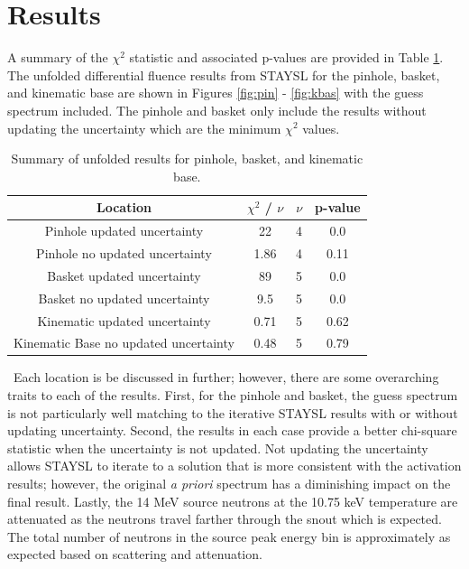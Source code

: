 \documentclass[journal]{IEEEtran}
\let\MYoriglatexcaption\caption
\renewcommand{\caption}[2][\relax]{\MYoriglatexcaption[#2]{#2}}
\begin{document}

\section{Results}

A summary of the $\chi^{2}$ statistic and associated p-values are provided in Table \ref{Table:STAY}. The unfolded differential fluence results from STAYSL for the pinhole, basket, and kinematic base are shown in Figures \ref{fig:pin} - \ref{fig:kbas} with the guess spectrum included. The pinhole and basket only include the results without updating the uncertainty which are the minimum $\chi^{2}$ values. 

\begin{table}[h]
	\caption{Summary of unfolded results for pinhole, basket, and kinematic base.}
	\label{Table:STAY}	
	\centering
	\begin{tabular}{|c|c|c|c|}
		\hline
		Location & $\chi^{2}$ / $\nu$ & $\nu$ & p-value \\ \hline
		Pinhole updated uncertainty & 22 & 4 & 0.0 \\ \hline
		Pinhole no updated uncertainty & 1.86 & 4 & 0.11 \\ \hline
		Basket updated uncertainty & 89 & 5 & 0.0 \\ \hline
		Basket no updated uncertainty & 9.5 & 5 & 0.0 \\ \hline
		Kinematic updated uncertainty & 0.71 & 5 & 0.62 \\ \hline
		Kinematic Base no updated uncertainty & 0.48 & 5 & 0.79 \\ \hline
	\end{tabular}
\end{table}

\ Each location is be discussed in further; however, there are some overarching traits to each of the results. First, for the pinhole and basket, the guess spectrum is not particularly well matching to the iterative STAYSL results with or without updating uncertainty. Second, the results in each case provide a better chi-square statistic when the uncertainty is not updated. Not updating the uncertainty allows STAYSL to iterate to a solution that is more consistent with the activation results; however, the original \textit{a priori} spectrum has a diminishing impact on the final result. Lastly, the 14 MeV source neutrons at the 10.75 keV temperature are attenuated as the neutrons travel farther through the snout which is expected. The total number of neutrons in the source peak energy bin is approximately as expected based on scattering and attenuation. 
\end{document}
